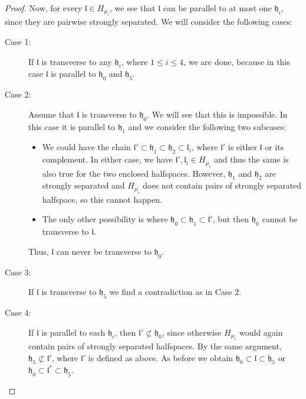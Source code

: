 \begin{proof}
  Now, for every \(\mathfrak{l} \in H_{\mu_i}\), we see that \(\mathfrak{l}\) can be parallel to at most one \(\mathfrak{h}_i\), since they are pairwise strongly separated. We will consider the following cases:
  \begin{description}
  \item[Case 1:] If \(\mathfrak{l}\) is transverse to any \(\mathfrak{h}_i\), where \(1 \leq i \leq 4\), we are done, because in this case \(\mathfrak{l}\) is parallel to \(\mathfrak{h}_0\) and \(\mathfrak{h}_5\).
  \item[Case 2:] Assume that \(\mathfrak{l}\) is transverse to \(\mathfrak{h}_0\). We will see that this is impossible. In this case it is parallel to \(\mathfrak{h}_1\) and we consider the following two subcases:
    \begin{itemize}
    \item We could have the chain \(\mathfrak{l}' \subset \mathfrak{h}_1 \subset \mathfrak{h}_2 \subset \mathfrak{l}_i\), where \(\mathfrak{l}'\) is either \(\mathfrak{l}\) or its complement. In either case, we have \(\mathfrak{l}', \mathfrak{l}_i \in H_{\mu_i}\) and thus the same is also true for the two enclosed halfspaces. However, \(\mathfrak{h}_1\) and \(\mathfrak{h}_2\) are strongly separated and \(H_{\mu_i}\) does not contain pairs of strongly separated halfspace, so this cannot happen.
    \item The only other possibility is where \(\mathfrak{h}_0 \subset \mathfrak{h}_1 \subset \mathfrak{l}'\), but then \(\mathfrak{h}_0\) cannot be transverse to \(\mathfrak{l}\). 
    \end{itemize}
    Thus, \(\mathfrak{l}\) can never be transverse to \(\mathfrak{h}_0\). 
  \item[Case 3:] If \(\mathfrak{l}\) is transverse to \(\mathfrak{h}_5\) we find a contradiction as in Case 2.
  \item[Case 4:] If \(\mathfrak{l}\) is parallel to each \(\mathfrak{h}_i\), then \(\mathfrak{l}' \not\subset \mathfrak{h_0}\), since otherwise \(H_{\mu_i}\) would again contain pairs of strongly separated halfspaces. By the same argument, \(\mathfrak{h}_5 \not\subset \mathfrak{l}'\), where \(\mathfrak{l}'\) is defined as above. As before we obtain \(\mathfrak{h}_0 \subset \mathfrak{l} \subset \mathfrak{h}_5\) or \(\mathfrak{h}_0 \subset \mathfrak{l}^\ast \subset \mathfrak{h}_5\).
  \end{description}
\end{proof}

